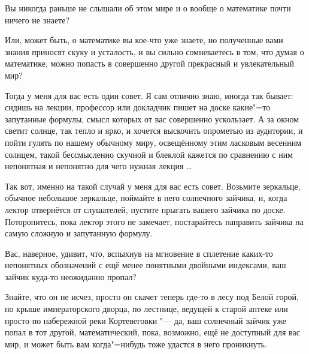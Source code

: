 Вы никогда раньше не слышали об этом мире и о вообще о математике почти ничего
не знаете?

Или, может быть, о математике вы кое-что уже знаете, но полученные вами знания
приносят скуку и усталость, и вы сильно сомневаетесь в том, что думая о
математике, можно попасть в совершенно другой прекрасный и увлекательный мир?

Тогда у меня для вас есть один совет.
Я сам отлично знаю, иногда так бывает: сидишь на лекции, профессор или докладчик
пишет на доске какие"=то запутанные формулы, смысл которых от вас совершенно
ускользает.
А за окном светит солнце, так тепло и ярко, и хочется выскочить опрометью из
аудитории, и пойти гулять по нашему обычному миру, освещённому этим ласковым
весенним солнцем, такой бессмысленно скучной и блеклой кажется по сравнению с
ним непонятная и непонятно для чего нужная лекция \ldots

Так вот, именно на такой случай у меня для вас есть совет.
Возьмите зеркальце, обычное небольшое зеркальце, поймайте в него солнечного
зайчика, и, когда лектор отвернётся от слушателей, пустите прыгать вашего
зайчика по доске.
Поторопитесь, пока лектор этого не замечает, постарайтесь направить зайчика на
самую сложную и запутанную формулу.

Вас, наверное, удивит, что, вспыхнув на мгновение в сплетение каких-то
непонятных обозначений с ещё менее понятными двойными индексами, ваш зайчик
куда-то неожиданно пропал?

Знайте, что он не исчез, просто он скачет теперь где-то в лесу под Белой горой,
по крыше императорского дворца, по лестнице, ведущей к старой аптеке или просто
по набережной реки Кортевеговки "--- да, ваш солнечный зайчик уже попал в тот
другой, математический, пока, возможно, ещё не доступный для вас мир, и может
быть вам когда"=нибудь тоже удастся в него проникнуть.
